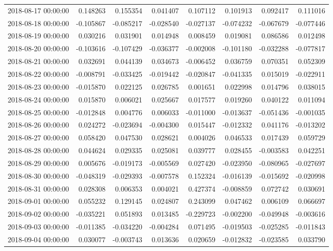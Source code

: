 \begin{tabular}{lrrrrrrr}
2018-08-17 00:00:00 & 0.148263 & 0.155354 & 0.041407 & 0.107112 & 0.101913 & 0.092417 & 0.111016 \\
2018-08-18 00:00:00 & -0.105867 & -0.085217 & -0.028540 & -0.027137 & -0.074232 & -0.067679 & -0.077446 \\
2018-08-19 00:00:00 & 0.030216 & 0.031901 & 0.014948 & 0.008459 & 0.019081 & 0.086586 & 0.012498 \\
2018-08-20 00:00:00 & -0.103616 & -0.107429 & -0.036377 & -0.002008 & -0.101180 & -0.032288 & -0.077817 \\
2018-08-21 00:00:00 & 0.032691 & 0.044139 & 0.034673 & -0.006452 & 0.036759 & 0.070351 & 0.052309 \\
2018-08-22 00:00:00 & -0.008791 & -0.033425 & -0.019442 & -0.020847 & -0.041335 & 0.015019 & -0.022911 \\
2018-08-23 00:00:00 & -0.015870 & 0.022125 & 0.026785 & 0.001651 & 0.022998 & 0.014796 & 0.038015 \\
2018-08-24 00:00:00 & 0.015870 & 0.006021 & 0.025667 & 0.017577 & 0.019260 & 0.040122 & 0.011094 \\
2018-08-25 00:00:00 & -0.012848 & 0.004776 & 0.006033 & -0.011000 & -0.013637 & -0.051436 & -0.001035 \\
2018-08-26 00:00:00 & 0.024272 & -0.023694 & -0.004300 & 0.015447 & -0.012332 & 0.041176 & -0.013202 \\
2018-08-27 00:00:00 & 0.058420 & 0.047530 & 0.028621 & 0.004026 & 0.046533 & 0.017439 & 0.059729 \\
2018-08-28 00:00:00 & 0.044624 & 0.029335 & 0.025081 & 0.039777 & 0.028455 & -0.003583 & 0.042251 \\
2018-08-29 00:00:00 & 0.005676 & -0.019173 & -0.005569 & 0.027420 & -0.023950 & -0.080965 & -0.027697 \\
2018-08-30 00:00:00 & -0.048319 & -0.029393 & -0.007578 & 0.152324 & -0.016139 & -0.015692 & -0.020998 \\
2018-08-31 00:00:00 & 0.028308 & 0.006353 & 0.004021 & 0.427374 & -0.008859 & 0.072742 & 0.030691 \\
2018-09-01 00:00:00 & 0.055232 & 0.129145 & 0.024807 & 0.243099 & 0.047462 & 0.006109 & 0.066697 \\
2018-09-02 00:00:00 & -0.035221 & 0.051893 & 0.013485 & -0.229723 & -0.002200 & -0.049948 & -0.003616 \\
2018-09-03 00:00:00 & -0.011385 & -0.034220 & -0.004284 & 0.071495 & -0.019503 & -0.025285 & -0.011843 \\
2018-09-04 00:00:00 & 0.030077 & -0.003743 & 0.013636 & 0.020659 & -0.012832 & -0.023585 & 0.033790 \\

\end{tabular}
